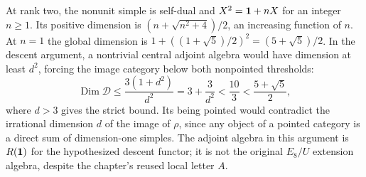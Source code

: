 At rank two, the nonunit simple is self-dual and
$X^2=\mathbf1+nX$ for an integer $n\geq1$. Its positive dimension
is $(n+\sqrt{n^2+4})/2$, an increasing function of $n$. At $n=1$
the global dimension is $1+((1+\sqrt5)/2)^2=(5+\sqrt5)/2$.
In the descent argument, a nontrivial central adjoint algebra would
have dimension at least $d^2$, forcing the image category below
both nonpointed thresholds:
\[
 \operatorname{Dim}\mathcal D
 \leq\frac{3(1+d^2)}{d^2}=3+\frac3{d^2}
 <\frac{10}{3}<\frac{5+\sqrt5}{2},
\]
where $d>3$ gives the strict bound. Its being pointed would
contradict the irrational dimension $d$ of the image of $\rho$,
since any object of a pointed category is a direct sum of
dimension-one simples. The adjoint algebra in this argument is
$R(\mathbf1)$ for the hypothesized descent functor; it is not the
original $E_8/U$ extension algebra, despite the chapter's reused
local letter $A$.

